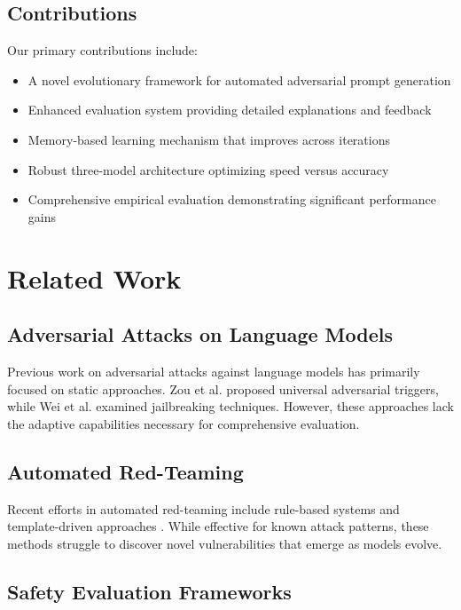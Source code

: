 \documentclass[11pt,twocolumn]{article}
\begin{document}
\subsection{Contributions}

Our primary contributions include:

\begin{itemize}
\item A novel evolutionary framework for automated adversarial prompt generation
\item Enhanced evaluation system providing detailed explanations and feedback
\item Memory-based learning mechanism that improves across iterations
\item Robust three-model architecture optimizing speed versus accuracy
\item Comprehensive empirical evaluation demonstrating significant performance gains
\end{itemize}

\section{Related Work}

\subsection{Adversarial Attacks on Language Models}

Previous work on adversarial attacks against language models has primarily focused on static approaches. Zou et al. \cite{zou2023universal} proposed universal adversarial triggers, while Wei et al. \cite{wei2023jailbroken} examined jailbreaking techniques. However, these approaches lack the adaptive capabilities necessary for comprehensive evaluation.

\subsection{Automated Red-Teaming}

Recent efforts in automated red-teaming include rule-based systems and template-driven approaches \cite{perez2022red}. While effective for known attack patterns, these methods struggle to discover novel vulnerabilities that emerge as models evolve.

\subsection{Safety Evaluation Frameworks}
\end{document}
